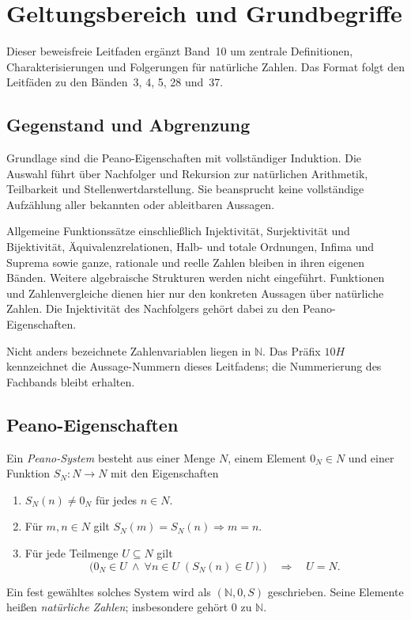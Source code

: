 \chapter{Geltungsbereich und Grundbegriffe}
\label{b10guide:ch:foundations}

Dieser beweisfreie Leitfaden ergänzt Band~10 um zentrale Definitionen,
Charakterisierungen und Folgerungen für natürliche Zahlen. Das Format
folgt den Leitfäden zu den Bänden~3, 4, 5, 28 und~37.

\section{Gegenstand und Abgrenzung}

Grundlage sind die Peano-Eigenschaften mit vollständiger Induktion.
Die Auswahl führt über Nachfolger und Rekursion zur natürlichen
Arithmetik, Teilbarkeit und Stellenwertdarstellung. Sie beansprucht
keine vollständige Aufzählung aller bekannten oder ableitbaren Aussagen.

Allgemeine Funktionssätze einschließlich Injektivität, Surjektivität
und Bijektivität, Äquivalenzrelationen, Halb- und totale Ordnungen,
Infima und Suprema sowie ganze, rationale und reelle Zahlen bleiben
in ihren eigenen Bänden. Weitere algebraische Strukturen werden
nicht eingeführt. Funktionen und Zahlenvergleiche dienen hier nur
den konkreten Aussagen über natürliche Zahlen. Die Injektivität
des Nachfolgers gehört dabei zu den Peano-Eigenschaften.

Nicht anders bezeichnete Zahlenvariablen liegen in $\mathbb N$.
Das Präfix $10H$ kennzeichnet die Aussage-Nummern dieses Leitfadens;
die Nummerierung des Fachbands bleibt erhalten.

\section{Peano-Eigenschaften}

\begin{definition}
\label{b10guide:def:peano}
Ein \emph{Peano-System} besteht aus einer Menge $N$, einem Element
$0_N\in N$ und einer Funktion $S_N\colon N\to N$ mit den Eigenschaften
\begin{enumerate}
 \item $S_N(n)\ne 0_N$ für jedes $n\in N$.
 \item Für $m,n\in N$ gilt $S_N(m)=S_N(n)\Rightarrow m=n$.
 \item Für jede Teilmenge $U\subseteq N$ gilt
 \[
  \bigl(0_N\in U\ \land\ \forall n\in U\;(S_N(n)\in U)\bigr)
  \quad\Longrightarrow\quad U=N.
 \]
\end{enumerate}
Ein fest gewähltes solches System wird als
$(\mathbb N,0,S)$ geschrieben. Seine Elemente heißen
\emph{natürliche Zahlen}; insbesondere gehört $0$ zu $\mathbb N$.
\end{definition}

